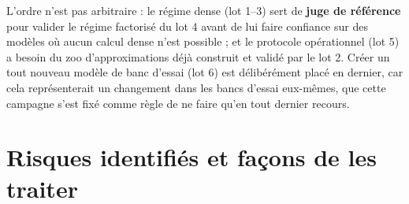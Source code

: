 \documentclass[11pt,a4paper]{article}
\begin{document}
L'ordre n'est pas arbitraire : le régime dense (lot 1--3) sert de \textbf{juge de référence} pour
valider le régime factorisé du lot 4 avant de lui faire confiance sur des modèles où aucun calcul
dense n'est possible ; et le protocole opérationnel (lot 5) a besoin du zoo d'approximations déjà
construit et validé par le lot 2. Créer un tout nouveau modèle de banc d'essai (lot 6) est
délibérément placé en dernier, car cela représenterait un changement dans les bancs d'essai
eux-mêmes, que cette campagne s'est fixé comme règle de ne faire qu'en tout dernier recours.

\section{Risques identifiés et façons de les traiter}
\end{document}
